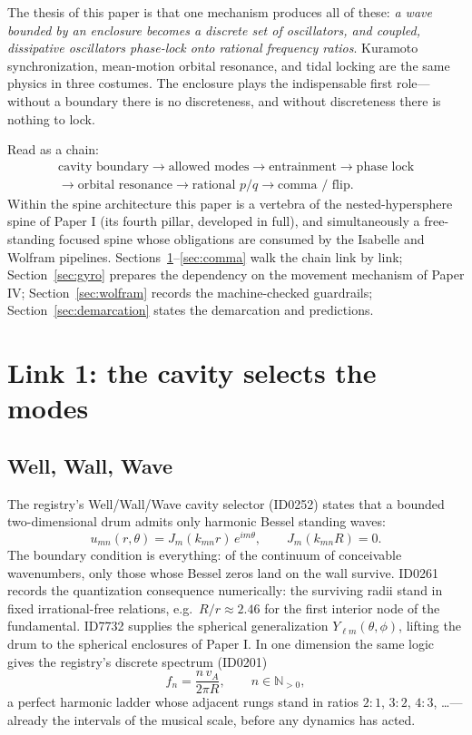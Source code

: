\documentclass[11pt]{article}
\theoremstyle{remark}
\begin{document}
The thesis of this paper is that one mechanism produces all of these: \emph{a wave bounded by an enclosure becomes a discrete set of oscillators, and coupled, dissipative oscillators phase-lock onto rational frequency ratios}. Kuramoto synchronization, mean-motion orbital resonance, and tidal locking are the same physics in three costumes. The enclosure plays the indispensable first role---without a boundary there is no discreteness, and without discreteness there is nothing to lock.

Read as a chain:
\begin{equation*}
\begin{gathered}
\text{cavity boundary} \to \text{allowed modes} \to \text{entrainment} \to \text{phase lock} \\
\to \text{orbital resonance} \to \text{rational } p/q \to \text{comma / flip}.
\end{gathered}
\end{equation*}
Within the spine architecture this paper is a vertebra of the nested-hypersphere spine of Paper I (its fourth pillar, developed in full), and simultaneously a free-standing focused spine whose obligations are consumed by the Isabelle and Wolfram pipelines. Sections~\ref{sec:cavity}--\ref{sec:comma} walk the chain link by link; Section~\ref{sec:gyro} prepares the dependency on the movement mechanism of Paper IV; Section~\ref{sec:wolfram} records the machine-checked guardrails; Section~\ref{sec:demarcation} states the demarcation and predictions.

\section{Link 1: the cavity selects the modes}
\label{sec:cavity}

\subsection{Well, Wall, Wave}

The registry's Well/Wall/Wave cavity selector (ID0252) states that a bounded two-dimensional drum admits only harmonic Bessel standing waves:
\begin{equation}
u_{mn}(r,\theta) = J_m(k_{mn} r)\, e^{im\theta}, \qquad J_m(k_{mn} R) = 0.
\label{eq:cavity}
\end{equation}
The boundary condition is everything: of the continuum of conceivable wavenumbers, only those whose Bessel zeros land on the wall survive. ID0261 records the quantization consequence numerically: the surviving radii stand in fixed irrational-free relations, e.g.\ $R/r \approx 2.46$ for the first interior node of the fundamental. ID7732 supplies the spherical generalization $Y_{\ell m}(\theta, \phi)$, lifting the drum to the spherical enclosures of Paper I. In one dimension the same logic gives the registry's discrete spectrum (ID0201)
\begin{equation}
f_n = \frac{n\, v_A}{2\pi R}, \qquad n \in \mathbb{N}_{>0},
\end{equation}
a perfect harmonic ladder whose adjacent rungs stand in ratios $2{:}1$, $3{:}2$, $4{:}3$, \dots---already the intervals of the musical scale, before any dynamics has acted.
\end{document}

